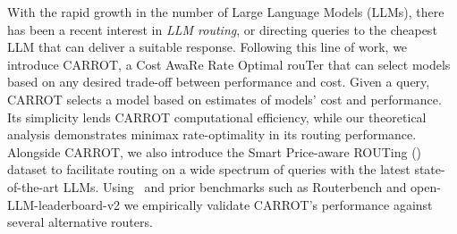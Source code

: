 With the rapid growth in the number of Large Language Models (LLMs), there has been a recent interest in \emph{LLM routing}, or directing queries to the cheapest LLM that can deliver a suitable response. 
Following this line of work, we introduce CARROT, a Cost AwaRe Rate Optimal rouTer that can select models based on any desired trade-off between performance and cost. Given a query, CARROT selects a model based on estimates of models' cost and performance. Its simplicity lends CARROT computational efficiency, while our theoretical analysis demonstrates minimax rate-optimality in its routing performance. Alongside CARROT, we also introduce the Smart Price-aware ROUTing (\newdata) dataset to facilitate routing on a wide spectrum of queries with the latest state-of-the-art LLMs. Using \newdata\ and prior benchmarks such as Routerbench and open-LLM-leaderboard-v2 we empirically validate CARROT's performance against several alternative routers. 